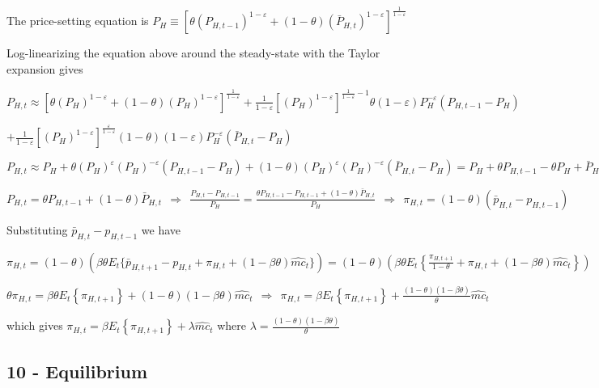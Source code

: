 \documentclass[
]{article}
\begin{document}
The price-setting equation is
\(\displaystyle P_H \equiv \left[ \theta (P_{H,t-1})^{1-\varepsilon} + (1-\theta)(\bar{P}_{H,t})^{1-\varepsilon}\right]^{\frac{1}{1-\varepsilon}}\)

Log-linearizing the equation above around the steady-state with the
Taylor expansion gives

\(\displaystyle P_{H,t} \approx [\theta(P_H)^{1-\varepsilon} + (1-\theta)(P_H)^{1-\varepsilon}]^{\frac{1}{1-\varepsilon}} + \frac{1}{1-\varepsilon} \left[ (P_H)^{1-\varepsilon} \right]^{\frac{1}{1-\varepsilon}-1} \theta(1-\varepsilon) P_H^{-\varepsilon} (P_{H,t-1}-P_H)\)

\(\displaystyle + \frac{1}{1-\varepsilon} \left[ (P_H)^{1-\varepsilon} \right]^{\frac{\varepsilon}{1-\varepsilon}} (1-\theta)(1-\varepsilon) P_H^{-\varepsilon} (\bar{P}_{H,t}-P_H)\)

\(\displaystyle P_{H,t} \approx P_H + \theta(P_H)^{\varepsilon}(P_H)^{-\varepsilon} (P_{H,t-1}-P_H) + (1-\theta)(P_H)^{\varepsilon}(P_H)^{-\varepsilon} (\bar{P}_{H,t}-P_H)=P_H+\theta P_{H,t-1} -\theta P_H +\bar{P}_{H,t}-P_H - \theta \bar{P}_{H,t} + \theta P_H\)

\(\displaystyle P_{H,t} = \theta P_{H,t-1} + (1-\theta) \bar{P}_{H,t} \ \ \Rightarrow \ \ \frac{P_{H,t}-P_{H,t-1}}{P_H} = \frac{\theta P_{H,t-1} - P_{H,t-1} + (1-\theta) \bar{P}_{H,t}}{P_H} \ \ \Rightarrow \ \ \pi_{H,t}=(1-\theta)(\bar{p}_{H,t}-p_{H,t-1})\)

Substituting \(\bar{p}_{H,t}-p_{H,t-1}\) we have

\(\displaystyle \pi_{H,t}=(1-\theta)(\beta \theta E_t \{ \bar{p}_{H,t+1}-p_{H,t} + \pi_{H,t}+(1-\beta \theta)\widehat{mc}_t\}) = (1-\theta) \left(\beta \theta E_t \left\{ \frac{\pi_{H,t+1}}{1-\theta} + \pi_{H,t}+(1-\beta \theta)\widehat{mc}_t \right\} \right)\)

\(\displaystyle \theta \pi_{H,t} = \beta \theta E_t \left\{ \pi_{H,t+1}\right\} +(1-\theta) (1-\beta \theta)\widehat{mc}_t \ \ \Rightarrow \ \  \pi_{H,t} = \beta E_t \left\{ \pi_{H,t+1}\right\} +\frac{(1-\theta) (1-\beta \theta)}{\theta}\widehat{mc}_t\)

which gives
\(\pi_{H,t} = \beta E_t \left\{ \pi_{H,t+1}\right\}+ \lambda\widehat{mc}_t\)
where
\(\displaystyle \lambda = \frac{(1-\theta) (1-\beta \theta)}{\theta}\)

\hypertarget{equilibrium}{%
\subsection{10 - Equilibrium}\label{equilibrium}}
\end{document}
